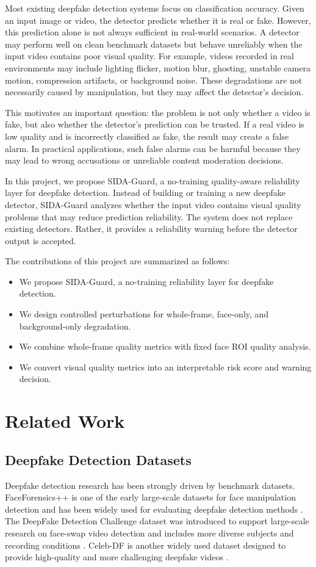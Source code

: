 \documentclass[conference]{IEEEtran}
\begin{document}
Most existing deepfake detection systems focus on classification accuracy. Given an input image or video, the detector predicts whether it is real or fake. However, this prediction alone is not always sufficient in real-world scenarios. A detector may perform well on clean benchmark datasets but behave unreliably when the input video contains poor visual quality. For example, videos recorded in real environments may include lighting flicker, motion blur, ghosting, unstable camera motion, compression artifacts, or background noise. These degradations are not necessarily caused by manipulation, but they may affect the detector's decision.

This motivates an important question: the problem is not only whether a video is fake, but also whether the detector's prediction can be trusted. If a real video is low quality and is incorrectly classified as fake, the result may create a false alarm. In practical applications, such false alarms can be harmful because they may lead to wrong accusations or unreliable content moderation decisions.

In this project, we propose SIDA-Guard, a no-training quality-aware reliability layer for deepfake detection. Instead of building or training a new deepfake detector, SIDA-Guard analyzes whether the input video contains visual quality problems that may reduce prediction reliability. The system does not replace existing detectors. Rather, it provides a reliability warning before the detector output is accepted.

The contributions of this project are summarized as follows:
\begin{itemize}
    \item We propose SIDA-Guard, a no-training reliability layer for deepfake detection.
    \item We design controlled perturbations for whole-frame, face-only, and background-only degradation.
    \item We combine whole-frame quality metrics with fixed face ROI quality analysis.
    \item We convert visual quality metrics into an interpretable risk score and warning decision.
\end{itemize}

\section{Related Work}
\subsection{Deepfake Detection Datasets}
Deepfake detection research has been strongly driven by benchmark datasets. FaceForensics++ is one of the early large-scale datasets for face manipulation detection and has been widely used for evaluating deepfake detection methods \cite{rossler2019faceforensics}. The DeepFake Detection Challenge dataset was introduced to support large-scale research on face-swap video detection and includes more diverse subjects and recording conditions \cite{dolhansky2020dfdc}. Celeb-DF is another widely used dataset designed to provide high-quality and more challenging deepfake videos \cite{li2019celebdf}.
\end{document}
